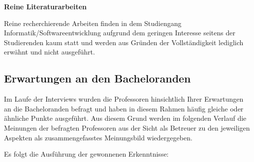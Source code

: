 \documentclass[bibliography=totoc,listof=totoc,BCOR=5mm,DIV=12,oneside]{scrbook}
\begin{document}
\par \bigskip \textbf{Reine Literaturarbeiten}
\par Reine recherchierende Arbeiten finden in dem Studiengang Informatik/Softwareentwicklung aufgrund dem geringen Interesse seitens der Studierenden kaum statt und werden aus Gründen der Vollständigkeit lediglich erwähnt und nicht ausgeführt.

\newpage
\subsection{Erwartungen an den Bacheloranden}
\par Im Laufe der Interviews wurden die Professoren hinsichtlich Ihrer Erwartungen an die Bacheloranden befragt und haben in diesem Rahmen häufig gleiche oder ähnliche Punkte ausgeführt. Aus diesem Grund werden im folgenden Verlauf die Meinungen der befragten Professoren aus der Sicht als Betreuer zu den jeweiligen Aspekten als zusammengefasstes Meinungsbild wiedergegeben.

\par\medskip Es folgt die Ausführung der gewonnenen Erkenntnisse:
\end{document}
